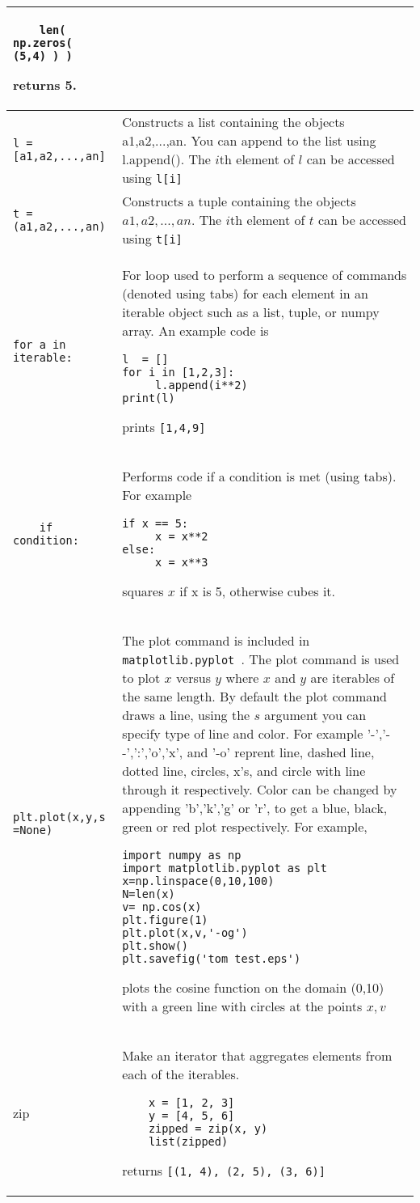 \documentclass[]{article}
\begin{document}
\begin{longtable}{ |m{6cm}  | m{11cm} |}
	\begin{verbatim}
	len( np.zeros( (5,4) ) )
	\end{verbatim}
    returns 5.
	\\\hline
	\texttt{l = [a1,a2,...,an]} & Constructs a list containing the objects a1,a2,...,an.  You can append to the list using l.append().  The $i$th element of $l$ can be accessed using {\texttt{l[i]} } 
	\\\hline
	\texttt{t =(a1,a2,...,an)} & Constructs a tuple containing the objects $a1,a2,...,an$.  The $i$th element of $t$ can be accessed using {\texttt{t[i]} }
	\\\hline
    \begin{verbatim}for a in iterable: \end{verbatim}  & For loop used to perform a sequence of commands (denoted using tabs) for each element in an iterable object such as a list, tuple, or numpy array. An example code is 
	\begin{verbatim}
l  = []
for i in [1,2,3]:
     l.append(i**2)
print(l)
	\end{verbatim} 
    prints \texttt{[1,4,9]} 
	\\\hline
	\begin{verbatim}
	if condition:
	\end{verbatim}
    & Performs code if a condition is met (using tabs). For example
	\begin{verbatim}
if x == 5:
     x = x**2
else:
     x = x**3
	\end{verbatim}
    squares $x$ if x is 5, otherwise cubes it.
	\\\hline
	\texttt{plt.plot(x,y,s =None)} & The plot command is included in {\texttt{matplotlib.pyplot }}.  The plot command is used to plot $x$ versus $y$ where $x$ and $y$ are iterables of the same length.  By default the plot command draws a line, using the $s$ argument you can specify type of line and color.  For example '-','- -',':','o','x', and '-o' reprent line, dashed line, dotted line, circles, x's, and circle with line through it respectively.  Color can be changed by appending 'b','k','g' or 'r', to get a blue, black, green or red plot respectively.  For example,
	\begin{verbatim}
import numpy as np
import matplotlib.pyplot as plt
x=np.linspace(0,10,100)
N=len(x)
v= np.cos(x)
plt.figure(1)
plt.plot(x,v,'-og')
plt.show()
plt.savefig('tom_test.eps')
	\end{verbatim} 
    plots the cosine function on the domain (0,10) with a green line with circles at the points $x,v$
	\\\hline
    zip & Make an iterator that aggregates elements from each of the iterables.
    \begin{verbatim}
    x = [1, 2, 3]
    y = [4, 5, 6]
    zipped = zip(x, y)
    list(zipped)
    \end{verbatim}
    returns \texttt{[(1, 4), (2, 5), (3, 6)]}
    \\\hline
\end{longtable}
\end{document}
